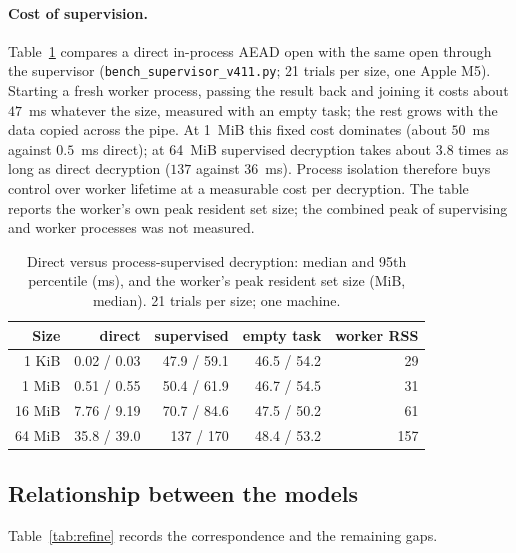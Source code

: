 \documentclass[pdflatex,sn-mathphys-num,twocolumn]{sn-jnl}
\theoremstyle{plain}
\theoremstyle{definition}
\newcommand{\code}[1]{\texttt{#1}}
\begin{document}
\paragraph{Cost of supervision.}
Table~\ref{tab:supervisor} compares a direct in-process AEAD open with the same open through the supervisor (\code{bench\_supervisor\_v411.py}; 21 trials per size, one Apple M5). Starting a fresh worker process, passing the result back and joining it costs about $47$~ms whatever the size, measured with an empty task; the rest grows with the data copied across the pipe. At 1~MiB this fixed cost dominates (about $50$~ms against $0.5$~ms direct); at 64~MiB supervised decryption takes about $3.8$ times as long as direct decryption ($137$ against $36$~ms). Process isolation therefore buys control over worker lifetime at a measurable cost per decryption. The table reports the worker's own peak resident set size; the combined peak of supervising and worker processes was not measured.

\begin{table}[t]
\caption{Direct versus process-supervised decryption: median and 95th percentile (ms), and the worker's peak resident set size (MiB, median). 21 trials per size; one machine.}\label{tab:supervisor}
\centering\footnotesize
\begin{tabular}{@{}rrrrr@{}}\toprule
Size & direct & supervised & empty task & worker RSS\\\midrule
1 KiB & 0.02 / 0.03 & 47.9 / 59.1 & 46.5 / 54.2 & 29\\
1 MiB & 0.51 / 0.55 & 50.4 / 61.9 & 46.7 / 54.5 & 31\\
16 MiB & 7.76 / 9.19 & 70.7 / 84.6 & 47.5 / 50.2 & 61\\
64 MiB & 35.8 / 39.0 & 137 / 170 & 48.4 / 53.2 & 157\\\bottomrule
\end{tabular}
\end{table}

\subsection{Relationship between the models}
Table~\ref{tab:refine} records the correspondence and the remaining gaps.
\end{document}
